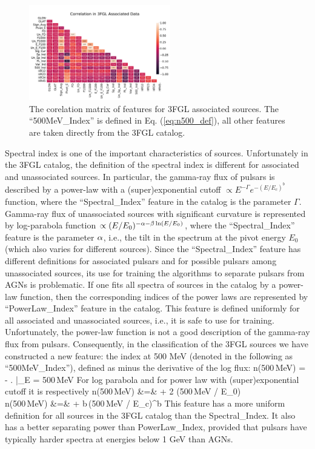 \begin{figure}[h]
\centering
\hspace*{-0.9cm}
\includegraphics[width=0.55\textwidth]{plots/new_correlations.pdf}
\caption{The corelation matrix of features for 3FGL associated sources.
The ``500MeV\_Index'' is defined in Eq. (\ref{eq:n500_def}), all other features are taken directly 
from the 3FGL catalog.
}
\label{fig:assoc_corr_3fgli}
\end{figure}

Spectral index is one of the important characteristics of sources. 
Unfortunately in the 3FGL catalog, the definition of the spectral index is different for associated and unassociated sources.
In particular, the gamma-ray flux of pulsars is described by a power-law with a (super)exponential cutoff $\propto E^{-\Gamma} e^{-(E / E_c)^b}$ 
function, where the ``Spectral\_Index'' feature in the catalog is the parameter $\Gamma$.
Gamma-ray flux of unassociated sources with significant curvature is represented by log-parabola function $\propto (E/E_0)^{-\alpha - \beta \ln (E/E_0)}$,
where the ``Spectral\_Index'' feature is the parameter $\alpha$, i.e., the tilt in the spectrum at the pivot energy $E_0$ (which also varies for different sources).
Since the ``Spectral\_Index'' feature has different definitions for associated pulsars and for possible pulsars among unassociated sources,
its use for training the algorithms to separate pulsars from AGNs is problematic.
If one fits all spectra of sources in the catalog by a power-law function, then the corresponding indices of the power laws are represented by
``PowerLaw\_Index'' feature in the catalog.
This feature is defined uniformly for all associated and unassociated sources, i.e., it is safe to use for training.
Unfortunately, the power-law function is not a good description of the gamma-ray flux from pulsars.
Consequently, in the classification of the 3FGL sources we have constructed a new feature: the index at 500 MeV (denoted in the following as ``500MeV\_Index''), defined as minus the derivative of the log flux:
\bea
{}
n({\rm 500\,MeV}) = - \left.  \right|_{E = \rm 500\,MeV}
\eea
For log parabola and for power law with (super)exponential cutoff it is respectively
\bea
n(\rm 500\,MeV) &=& \al + 2 \bt \ln(\rm 500\,MeV / E_0)    \\
n({\rm 500\,MeV}) &=& \Gamma + b\,({\rm 500\,MeV} / E_c)^b
\eea
This feature has a more uniform definition for all sources in the 3FGL catalog than the Spectral\_Index. It also has a better separating power 
than PowerLaw\_Index, provided that pulsars have typically harder spectra at energies below 1 GeV than AGNs.

